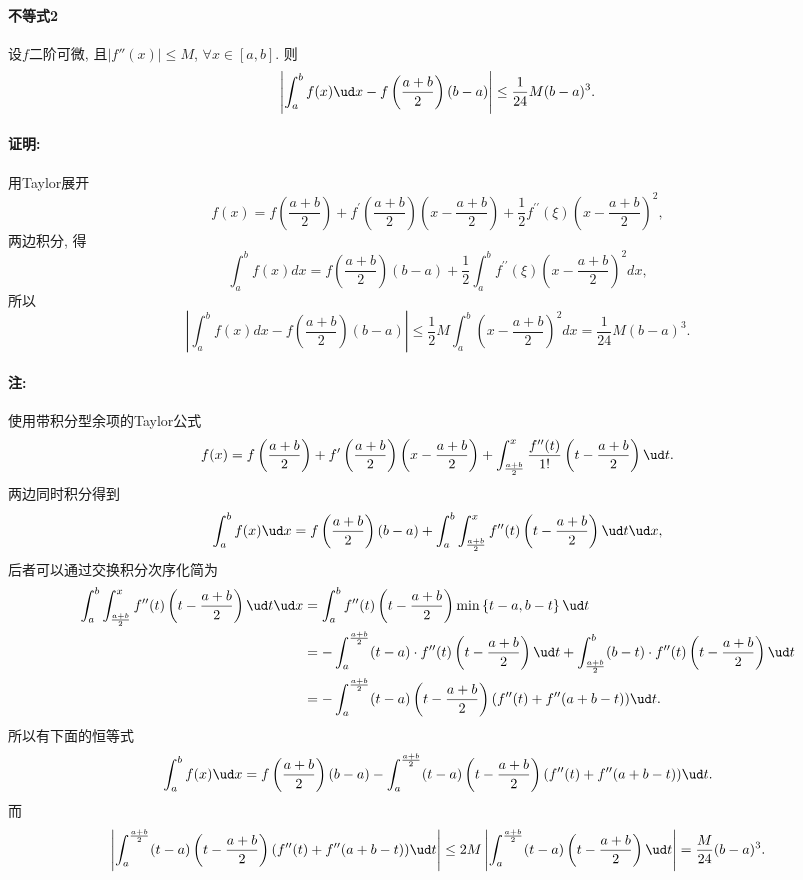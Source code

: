 \paragraph{不等式2}

设$f$二阶可微, 且$\left|f''(x)\right|\le M$, $\forall x\in[a,b]$. 则
\[
\left|\int_{a}^{b}f(x)\ud x-f\left(\frac{a+b}{2}\right)(b-a)\right|\le\frac{1}{24}M(b-a)^{3}.
\]


\paragraph{证明:}

用Taylor展开
\[
f(x)=f\left(\frac{a+b}{2}\right)+f^{\prime}\left(\frac{a+b}{2}\right)\left(x-\frac{a+b}{2}\right)+\frac{1}{2}f^{\prime\prime}(\xi)\left(x-\frac{a+b}{2}\right)^{2},
\]
两边积分, 得
\[
\int_{a}^{b}f(x)dx=f\left(\frac{a+b}{2}\right)(b-a)+\frac{1}{2}\int_{a}^{b}f^{\prime\prime}(\xi)\left(x-\frac{a+b}{2}\right)^{2}dx,
\]
所以
\[
\left|\int_{a}^{b}f(x)dx-f\left(\frac{a+b}{2}\right)(b-a)\right|\leqslant\frac{1}{2}M\int_{a}^{b}\left(x-\frac{a+b}{2}\right)^{2}dx=\frac{1}{24}M(b-a)^{3}.
\]


\paragraph{注:}

使用带积分型余项的Taylor公式
\[
f(x)=f\left(\frac{a+b}{2}\right)+f'\left(\frac{a+b}{2}\right)\left(x-\frac{a+b}{2}\right)+\int_{\frac{a+b}{2}}^{x}\frac{f''(t)}{1!}\left(t-\frac{a+b}{2}\right)\ud t.
\]
两边同时积分得到
\[
\int_{a}^{b}f(x)\ud x=f\left(\frac{a+b}{2}\right)(b-a)+\int_{a}^{b}\int_{\frac{a+b}{2}}^{x}f''(t)\left(t-\frac{a+b}{2}\right)\ud t\ud x,
\]
后者可以通过交换积分次序化简为
\begin{align*}
	\int_{a}^{b}\int_{\frac{a+b}{2}}^{x}f''(t)\left(t-\frac{a+b}{2}\right)\ud t\ud x & =\int_{a}^{b}f''(t)\left(t-\frac{a+b}{2}\right)\min\left\{ t-a,b-t\right\} \ud t\\
	& =-\int_{a}^{\frac{a+b}{2}}(t-a)\cdot f''(t)\left(t-\frac{a+b}{2}\right)\ud t+\int_{\frac{a+b}{2}}^{b}(b-t)\cdot f''(t)\left(t-\frac{a+b}{2}\right)\ud t\\
	& =-\int_{a}^{\frac{a+b}{2}}(t-a)\left(t-\frac{a+b}{2}\right)(f''(t)+f''(a+b-t))\ud t.
\end{align*}
所以有下面的恒等式
\[
\int_{a}^{b}f(x)\ud x=f\left(\frac{a+b}{2}\right)(b-a)-\int_{a}^{\frac{a+b}{2}}(t-a)\left(t-\frac{a+b}{2}\right)(f''(t)+f''(a+b-t))\ud t.
\]
而
\[
\left|\int_{a}^{\frac{a+b}{2}}(t-a)\left(t-\frac{a+b}{2}\right)(f''(t)+f''(a+b-t))\ud t\right|\le2M\left|\int_{a}^{\frac{a+b}{2}}(t-a)\left(t-\frac{a+b}{2}\right)\ud t\right|=\frac{M}{24}(b-a)^{3}.
\]


